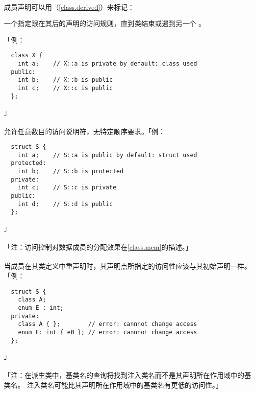 \paragraph{}
成员声明可以用（\ref{class.derived}）来标记：            \\
\mbox{}

一个指定跟在其后的声明的访问规则，直到类结束或遇到另一个
。

「例：
\begin{lstlisting}
  class X {
    int a;    // X::a is private by default: class used
  public:
    int b;    // X::b is public
    int c;    // X::c is public
  };
\end{lstlisting}」

\paragraph{}
允许任意数目的访问说明符，无特定顺序要求。「例：
\begin{lstlisting}
  struct S {
    int a;    // S::a is public by default: struct used
  protected:
    int b;    // S::b is protected
  private:
    int c;    // S::c is private
  public:
    int d;    // S::d is public
  };
\end{lstlisting}」

\paragraph{}
「注：访问控制对数据成员的分配效果在\ref{class.mem}的描述。」

\paragraph{}
当成员在其类定义中重声明时，其声明点所指定的访问性应该与其初始声明一样。「例：
\begin{lstlisting}
  struct S {
    class A;
    enum E : int;
  private:
    class A { };        // error: cannnot change access
    enum E: int { e0 }; // error: cannnot change access
  };
\end{lstlisting}」

\paragraph{}
「注：在派生类中，基类名的查询将找到注入类名而不是其声明所在作用域中的基类名。
注入类名可能比其声明所在作用域中的基类名有更低的访问性。」

